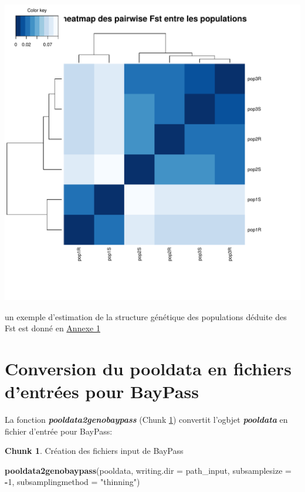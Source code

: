 \documentclass[
  openany]{book}
\newenvironment{Shaded}{\begin{snugshade}}{\end{snugshade}}
\newcommand{\AttributeTok}[1]{\textcolor[rgb]{0.13,0.29,0.53}{#1}}
\newcommand{\DecValTok}[1]{\textcolor[rgb]{0.00,0.00,0.81}{#1}}
\newcommand{\FunctionTok}[1]{\textcolor[rgb]{0.13,0.29,0.53}{\textbf{#1}}}
\newcommand{\NormalTok}[1]{#1}
\newcommand{\SpecialCharTok}[1]{\textcolor[rgb]{0.81,0.36,0.00}{\textbf{#1}}}
\newcommand{\StringTok}[1]{\textcolor[rgb]{0.31,0.60,0.02}{#1}}
\theoremstyle{definition}
\theoremstyle{definition}
\theoremstyle{definition}
\newtheorem{exercise}{Chunk}[chapter]
\theoremstyle{definition}
\theoremstyle{remark}
\begin{document}
\includegraphics{BayPass_Fr_files/figure-latex/heatmap-PW-fst-1.pdf}

un exemple d'estimation de la structure génétique des populations déduite des Fst est donné en \protect\hyperlink{An1}{Annexe 1}

\hypertarget{conversion-du-pooldata-en-fichiers-dentruxe9es-pour-baypass}{%
\chapter*{Conversion du pooldata en fichiers d'entrées pour BayPass}\label{conversion-du-pooldata-en-fichiers-dentruxe9es-pour-baypass}}

La fonction \textbf{\emph{pooldata2genobaypass}} (Chunk \ref{exr:chunk4}) convertit l'ogbjet \textbf{\emph{pooldata}} en fichier d'entrée pour BayPass:

\begin{exercise}
\protect\hypertarget{exr:chunk4}{}\label{exr:chunk4}{Création des fichiers input de BayPass}
\end{exercise}

\begin{Shaded}
\begin{Highlighting}[]
\FunctionTok{pooldata2genobaypass}\NormalTok{(pooldata, }\AttributeTok{writing.dir =}\NormalTok{ path\_input, }\AttributeTok{subsamplesize =} \SpecialCharTok{{-}}\DecValTok{1}\NormalTok{, }\AttributeTok{subsamplingmethod =} \StringTok{"thinning"}\NormalTok{)}
\end{Highlighting}
\end{Shaded}
\end{document}
